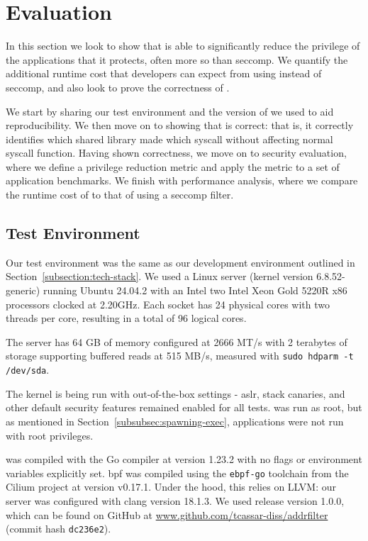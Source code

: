 \section{Evaluation}\label{sec:evaluation}

In this section we look to show that \af is able to significantly reduce the
privilege of the applications that it protects, often more so than seccomp. We 
quantify the additional runtime cost that developers can expect from using \af 
instead of seccomp, and also look to prove the correctness of \afss.

We start by sharing our test environment and the version of \af we used to
aid reproducibility. We then move on to showing that \af is correct: that
is, it correctly identifies which shared library made which syscall without
affecting normal syscall function. Having shown correctness, we move on to
security evaluation, where we define a privilege reduction metric and apply the
metric to a set of application benchmarks. We finish with performance analysis,
where we compare the runtime cost of \af to that of using a seccomp filter.

\subsection{Test Environment}

Our test environment was the same as our development environment outlined in
Section~\ref{subsection:tech-stack}. We used a Linux server (kernel version
6.8.52-generic) running Ubuntu 24.04.2 with an Intel two Intel Xeon
Gold 5220R x86 processors clocked at 2.20GHz. Each socket has 24 physical 
cores with two threads per core, resulting in a total of 96 logical cores.

The server has 64 GB of memory configured at 2666 MT/s  with 2 terabytes
of storage supporting buffered reads at 515 MB/s, measured with 
\texttt{sudo hdparm -t /dev/sda}.

The kernel is being run with out-of-the-box settings - \ac{aslr}, stack
canaries, and other default security features remained enabled for all tests.
\af was run as root, but as mentioned in Section~\ref{subsubsec:spawning-exec},
applications were not run with root privileges.

\af was compiled with the Go compiler at version 1.23.2 with no flags or
environment variables explicitly set. \ac{bpf} was
compiled using the \texttt{ebpf-go} toolchain from the Cilium project at version
v0.17.1. Under the hood, this relies on LLVM: our server was configured with
clang version 18.1.3. We used \af release version 1.0.0, which can be found on
GitHub at
\href{https://www.github.com/tcassar-diss/addrfilter}{www.github.com/tcassar-diss/addrfilter} (commit hash \texttt{dc236e2}).

